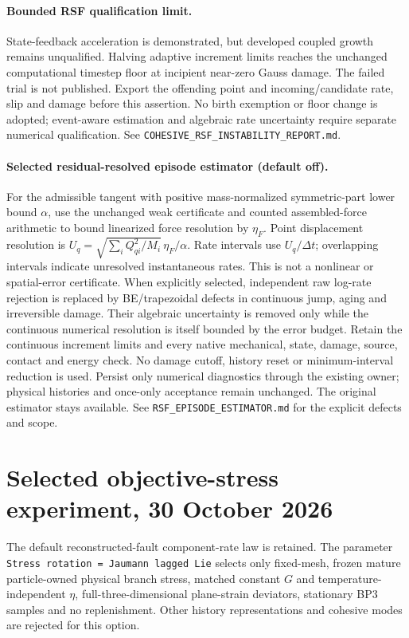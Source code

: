 \documentclass[11pt]{article}
\begin{document}
\paragraph{Bounded RSF qualification limit.}
State-feedback acceleration is demonstrated, but developed coupled growth remains
unqualified. Halving adaptive increment limits reaches the unchanged computational
timestep floor at incipient near-zero Gauss damage. The failed trial is not
published. Export the offending point and incoming/candidate rate, slip and damage
before this assertion. No birth exemption or floor change is adopted; event-aware
estimation and algebraic rate uncertainty require separate numerical qualification.
See \texttt{COHESIVE\_RSF\_INSTABILITY\_REPORT.md}.


\paragraph{Selected residual-resolved episode estimator (default off).}
For the admissible tangent with positive mass-normalized symmetric-part lower
bound $\alpha$, use the unchanged weak certificate and counted assembled-force
arithmetic to bound linearized force resolution by $\eta_F$. Point displacement
resolution is $U_q=\sqrt{\sum_i Q_{qi}^2/M_i}\,\eta_F/\alpha$.
Rate intervals use $U_q/\Delta t$; overlapping intervals indicate unresolved
instantaneous rates. This is not a nonlinear or spatial-error certificate.
When explicitly selected, independent raw log-rate rejection is replaced by
BE/trapezoidal defects in continuous jump, aging and irreversible damage.
Their algebraic uncertainty is removed only while the continuous numerical
resolution is itself bounded by the error budget. Retain the continuous increment
limits and every native mechanical, state, damage, source, contact and energy
check. No damage cutoff, history reset or minimum-interval reduction is used.
Persist only numerical diagnostics through the existing owner; physical histories
and once-only acceptance remain unchanged. The original estimator stays available.
See \texttt{RSF\_EPISODE\_ESTIMATOR.md} for the explicit defects and scope.

\section{Selected objective-stress experiment, 30 October 2026}
The default reconstructed-fault component-rate law is retained. The parameter
\texttt{Stress rotation = Jaumann lagged Lie} selects only fixed-mesh, frozen
mature particle-owned physical branch stress, matched constant $G$ and
temperature-independent $\eta$, full-three-dimensional plane-strain
deviators, stationary BP3 samples and no replenishment. Other history
representations and cohesive modes are rejected for this option.
\end{document}
